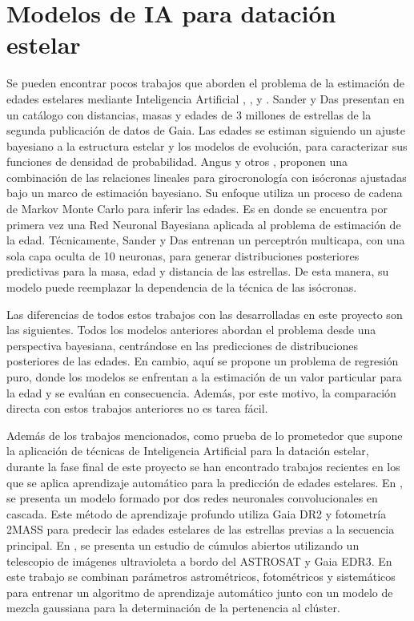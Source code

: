 \section{Modelos de IA para datación estelar}
Se pueden encontrar pocos trabajos que aborden el problema de la estimación de edades estelares mediante Inteligencia Artificial \cite{stardate}, \cite{Angus19}, \cite{das2018} y \cite{sanders2018}. Sander y Das presentan en \cite{sanders2018} un catálogo con distancias, masas y edades de 3 millones de estrellas de la segunda publicación de datos de Gaia. %
Las edades se estiman siguiendo un ajuste bayesiano a la estructura estelar y los modelos de evolución, para caracterizar sus funciones de densidad de probabilidad. Angus y otros \cite{stardate}, \cite{Angus19} proponen una combinación de las relaciones lineales para girocronología con isócronas ajustadas bajo un marco de estimación bayesiano. Su enfoque utiliza un proceso de cadena de Markov Monte Carlo para inferir las edades. Es en \cite{sanders2018} donde se encuentra por primera vez una Red Neuronal Bayesiana aplicada al problema de estimación de la edad. Técnicamente, Sander y Das \cite{sanders2018} entrenan un perceptrón multicapa, con una sola capa oculta de 10 neuronas, para generar distribuciones posteriores predictivas para la masa, edad y distancia de las estrellas. De esta manera, su modelo puede reemplazar la dependencia de la técnica de las isócronas. 

Las diferencias de todos estos trabajos con las desarrolladas en este proyecto son las siguientes. Todos los modelos anteriores abordan el problema desde una perspectiva bayesiana, centrándose en las predicciones de distribuciones posteriores de las edades. En cambio, aquí se propone un problema de regresión puro, donde los modelos se enfrentan a la estimación de un valor particular para la edad y se evalúan en consecuencia. Además, por este motivo, la comparación directa con estos trabajos anteriores no es tarea fácil.

Además de los trabajos mencionados, como prueba de lo prometedor que supone la aplicación de técnicas de Inteligencia Artificial para la datación estelar, durante la fase final de este proyecto se han encontrado trabajos recientes en los que se aplica aprendizaje automático para la predicción de edades estelares. En \cite{2020AAS...23633104M}, se presenta un modelo formado por dos redes neuronales convolucionales en cascada. Este método de aprendizaje profundo utiliza Gaia DR2 y fotometría 2MASS para predecir las edades estelares de las estrellas previas a la secuencia principal. En \cite{Jadhav_2021}, se presenta un estudio de cúmulos abiertos utilizando un telescopio de imágenes ultravioleta a bordo del ASTROSAT y Gaia EDR3. En este trabajo se combinan parámetros astrométricos, fotométricos y sistemáticos para entrenar un algoritmo de aprendizaje automático junto con un modelo de mezcla gaussiana para la determinación de la pertenencia al clúster.


